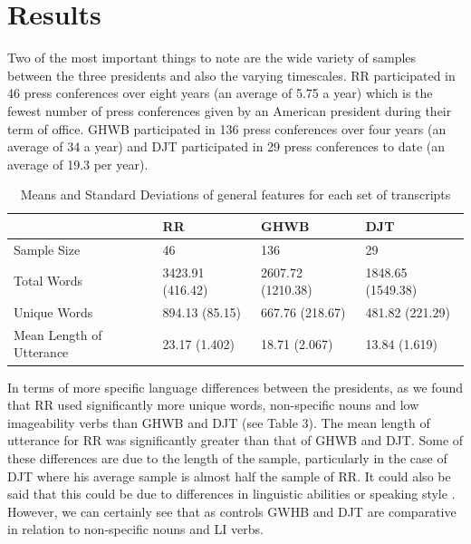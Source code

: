 \documentclass[12pt]{article}
\begin{document}
\section{Results}\label{results}
Two of the most important things to note are the wide variety of samples between the three presidents and also the varying timescales. RR participated in 46 press conferences over eight years (an average of 5.75 a year) which is the fewest number of press conferences given by an American president during their term of office. GHWB participated in 136 press conferences over four years (an average of 34 a year) and DJT participated in 29 press conferences to date (an average of 19.3 per year). 

\begin{table}[H]
	\begin{center}
	\begin{tabular}{ | p{3cm} | p{1.5cm} | p{1.5cm} | p{1.5cm} |}
		\hline
		& RR & GHWB & DJT \\ \hline
		Sample Size & 46 & 136 & 29 \\ \hline
		Total Words & 3423.91 (416.42) & 2607.72 (1210.38) & 1848.65 (1549.38) \\ \hline
		Unique Words & 894.13 (85.15) & 667.76 (218.67) & 481.82 (221.29) \\ \hline
		Mean Length of Utterance & 23.17 (1.402) & 18.71 (2.067) & 13.84 (1.619) \\ \hline
	\end{tabular}
	\caption{\label{tab:table-name}Means and Standard Deviations of general features for each set of transcripts}
	\end{center} 
\end{table}

In terms of more specific language differences between the presidents, as we found that RR used significantly more unique words, non-specific nouns and low imageability verbs than GHWB and DJT (see Table 3). The mean length of utterance for RR was significantly greater than that of GHWB and DJT. Some of these differences are due to the length of the sample, particularly in the case of DJT where his average sample is almost half the sample of RR. It could also be said that this could be due to differences in linguistic abilities or speaking style \cite{Berisha2015, Le2011}. However, we can certainly see that as controls GWHB and DJT are comparative in relation to non-specific nouns and LI verbs. 
\end{document}
